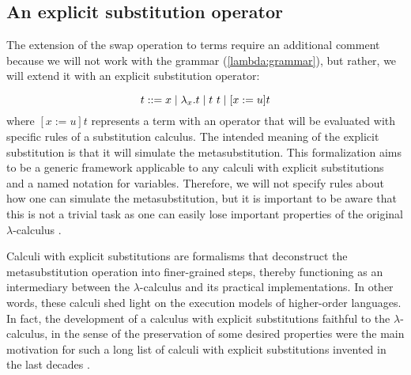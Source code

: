 \subsection{An explicit substitution operator}



 The extension of the swap operation to terms require an additional comment because we will not work with the grammar (\ref{lambda:grammar}), but rather, we will extend it with an explicit substitution operator:


\begin{equation}\label{es:grammar}
  t ::= x \mid \lambda_x.t \mid t\ t \mid \esub{t}{x}{u}
\end{equation}
\noindent where $[x := u] t$ represents a term with an operator that will be evaluated with specific rules of a substitution calculus. The intended meaning of the explicit substitution is that it will simulate the metasubstitution. This formalization aims to be a generic framework applicable to any calculi with explicit substitutions and a named notation for variables. Therefore, we will not specify rules about how one can simulate the metasubstitution, but it is important to be aware that this is not a trivial task as one can easily lose important properties of the original $\lambda$-calculus \cite{melliesTypedLcalculiExplicit1995,guillaumeLambdaCalculusDoes2000}.


Calculi with explicit substitutions are formalisms that deconstruct the metasubstitution operation into finer-grained steps, thereby functioning as an intermediary between the $\lambda$-calculus and its practical implementations. In other words, these calculi shed light on the execution models of higher-order languages. In fact, the development of a calculus with explicit substitutions faithful to the $\lambda$-calculus, in the sense of the preservation of some desired properties were the main motivation for such a long list of calculi with explicit substitutions invented in the last decades \cite{abadiExplicitSubstitutions1991,blooPreservationStrongNormalisation1995,benaissaLambdaUpsilonCalculus1996,curienConfluencePropertiesWeak1996,munozConfluencePreservationStrong1996,kamareddineExtendingLambdaCalculusExplicit1997,blooExplicitSubstitutionEdge1999,davidLambdacalculusExplicitWeakening2001,kesnerTheoryExplicitSubstitutions2009}.



